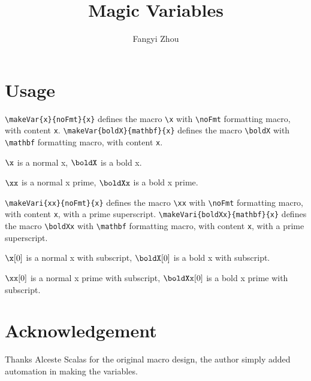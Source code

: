 \documentclass{article}
\title{Magic Variables}
\author{Fangyi Zhou}
\begin{document}
\maketitle
\section{Usage}

\verb+\makeVar{x}{noFmt}{x}+ defines the macro \verb+\x+ with \verb+\noFmt+
formatting macro, with content \verb+x+.
\verb+\makeVar{boldX}{mathbf}{x}+ defines the macro \verb+\boldX+ with
\verb+\mathbf+ formatting macro, with content \verb+x+.

$\x$ is a normal x, $\boldX$ is a bold x.

$\xx$ is a normal x prime, $\boldXx$ is a bold x prime.

\verb+\makeVari{xx}{noFmt}{x}+ defines the macro \verb+\xx+ with \verb+\noFmt+
formatting macro, with content \verb+x+, with a prime superscript.
\verb+\makeVari{boldXx}{mathbf}{x}+ defines the macro \verb+\boldXx+ with
\verb+\mathbf+ formatting macro, with content \verb+x+, with a prime
superscript.

$\x[0]$ is a normal x with subscript, $\boldX[0]$ is a bold x with subscript.

$\xx[0]$ is a normal x prime with subscript, $\boldXx[0]$ is a bold x prime
with subscript.

\section*{Acknowledgement}

Thanks Alceste Scalas for the original macro design, the author simply added
automation in making the variables.
\end{document}
